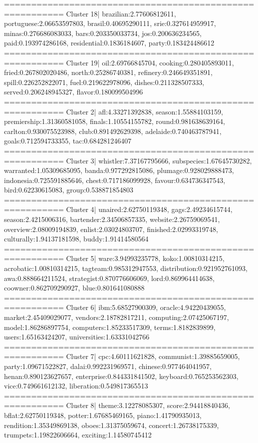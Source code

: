 ========================================================= 
Cluster 18| brazilian:2.77606812611, portuguese:2.06653597803, brasil:0.40695290111, srie:0.327614959917, minas:0.276686083033, bars:0.203350033734, jos:0.200636234565, paid:0.193974286168, residential:0.1836184607, party:0.183424486612
========================================================= 
Cluster 19| oil:2.69766845704, cooking:0.280405893011, fried:0.267802020486, north:0.25286740381, refinery:0.246649351891, spill:0.226252822071, fuel:0.219622978096, dishes:0.211328507333, served:0.206248945327, flavor:0.180099504996
========================================================= 
Cluster 2| afl:4.33271392838, season:1.55884103159, premiership:1.31360581058, finals:1.10554155782, round:0.981638639164, carlton:0.930075523988, club:0.891492629398, adelaide:0.740463787941, goals:0.712594733355, tac:0.684281246407
========================================================= 
Cluster 3| whistler:7.37167795666, subspecies:1.67645730282, warranted:1.05309685095, banda:0.977292815086, plumage:0.928029888473, indonesia:0.725591885646, chest:0.717186099928, favour:0.634736347543, bird:0.62230615083, group:0.538871854803
========================================================= 
Cluster 4| unaired:2.62750119348, gags:2.49234615744, season:2.4215006316, bartender:2.34506857335, website:2.26759069541, overview:2.08009194839, enlist:2.03024803707, finished:2.02993319748, culturally:1.94137181598, buddy:1.91414580564
========================================================= 
Cluster 5| ware:3.94993235778, koko:1.00810314215, acrobatic:1.00810314215, tagteam:0.985312947553, distribution:0.921952761093, awa:0.888664211524, strategist:0.870776606069, lord:0.869964414638, coowner:0.862709290927, blue:0.801641080888
========================================================= 
Cluster 6| ibm:5.68527900309, oracle:4.94220439055, market:2.45409029077, vendors:2.18782817211, computing:2.07425067197, model:1.86286897754, computers:1.85233517309, terms:1.8182839899, users:1.65163424207, universities:1.63331042766
========================================================= 
Cluster 7| cpc:4.60111621828, communist:1.39885659005, party:1.09671522827, dalai:0.992231969571, chinese:0.977464041957, henan:0.890123627657, enterprise:0.844331841502, keyboard:0.765253562303, vice:0.749661612132, liberation:0.549817365513
========================================================= 
Cluster 8| theme:3.12278085307, score:2.94418840436, bflat:2.62750119348, potter:1.67685469165, piano:1.41790935013, rendition:1.35349869138, oboes:1.31375059674, concert:1.26738175339, trumpets:1.19822606664, exciting:1.14580745412
